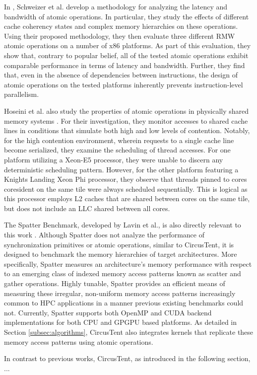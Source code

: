 In \cite{schweizer2015evaluating}, Schweizer et al. develop a methodology for analyzing the latency and bandwidth of atomic operations.
In particular, they study the effects of different cache coherency states and complex memory hierarchies on these operations.
Using their proposed methodology, they then evaluate three different RMW atomic operations on a number of x86 platforms.
As part of this evaluation, they show that, contrary to popular belief, all of the tested atomic operations exhibit comparable performance in terms of latency and bandwidth.
Further, they find that, even in the absence of dependencies between instructions, the design of atomic operations on the tested platforms inherently prevents instruction-level parallelism.

Hoseini et al. also study the properties of atomic operations in physically shared memory systems \cite{hoseini2019modeling}.
For their investigation, they monitor accesses to shared cache lines in conditions that simulate both high and low levels of contention.
Notably, for the high contention environment, wherein requests to a single cache line become serialized, they examine the scheduling of thread accesses.
For one platform utilizing a Xeon-E5 processor, they were unable to discern any deterministic scheduling pattern.
However, for the other platform featuring a Knights Landing Xeon Phi processor, they observe that threads pinned to cores coresident on the same tile were always scheduled sequentially.
This is logical as this processor employs L2 caches that are shared between cores on the same tile, but does not include an LLC shared between all cores.

The Spatter Benchmark, developed by Lavin et al., is also directly relevant to this work \cite{lavin2018spatter}.
Although Spatter does not analyze the performance of synchronization primitives or atomic operations, similar to CircusTent, it is designed to benchmark the memory hierarchies of target architectures.
More specifically, Spatter measures an architecture's memory performance with respect to an emerging class of indexed memory access patterns known as scatter and gather operations.
Highly tunable, Spatter provides an efficient means of measuring these irregular, non-uniform memory access patterns increasingly common to HPC applications in a manner previous existing benchmarks could not.
Currently, Spatter supports both OpenMP and CUDA backend implementations for both CPU and GPGPU based platforms.
As detailed in Section \ref{subsec:algorithms}, CircusTent also integrates kernels that replicate these memory access patterns using atomic operations. 

In contrast to previous works, CircusTent, as introduced in the following section, ...



